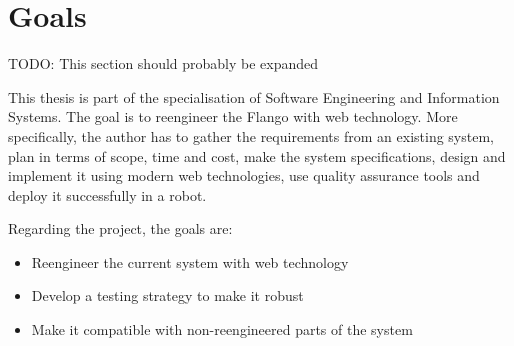 




\section{Goals}
TODO: This section should probably be expanded

This thesis is part of the specialisation of Software Engineering and Information Systems. 
The goal is to reengineer the Flango \cm with web technology.
More specifically, the author has to gather the requirements from an existing system, plan in terms of scope, time and cost, make the system specifications, design and implement it using modern web technologies, use quality assurance tools and deploy it successfully in a  robot.

Regarding the project, the goals are:
\begin{itemize}
	\item Reengineer the current system with web technology
	\item Develop a testing strategy to make it robust
	\item Make it compatible with non-reengineered parts of the system
\end{itemize}


